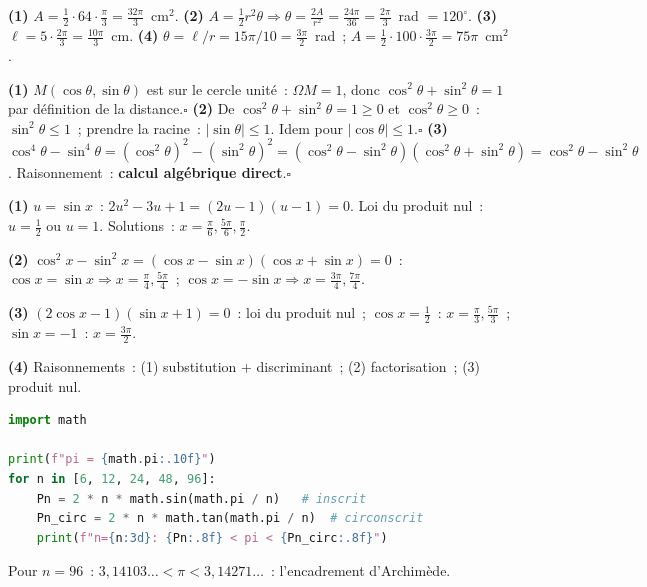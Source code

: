 
\textbf{(1)} $A=\frac{1}{2}\cdot64\cdot\frac{\pi}{3}=\frac{32\pi}{3}$~cm$^2$.
\textbf{(2)} $A=\frac{1}{2}r^2\theta\Rightarrow\theta=\frac{2A}{r^2}=\frac{24\pi}{36}=\frac{2\pi}{3}$~rad $=120^{\circ}$.
\textbf{(3)} $\ell=5\cdot\frac{2\pi}{3}=\frac{10\pi}{3}$~cm.
\textbf{(4)} $\theta=\ell/r=15\pi/10=\frac{3\pi}{2}$~rad~; $A=\frac{1}{2}\cdot100\cdot\frac{3\pi}{2}=75\pi$~cm$^2$.


\textbf{(1)} $M(\cos\theta,\sin\theta)$ est sur le cercle unit\'e~: $\Omega M=1$, donc
$\cos^2\theta+\sin^2\theta=1$ par d\'efinition de la distance.\hfill$\square$
\textbf{(2)} De $\cos^2\theta+\sin^2\theta=1\geq0$ et $\cos^2\theta\geq0$~: $\sin^2\theta\leq1$~;
prendre la racine~: $|\sin\theta|\leq1$. Idem pour $|\cos\theta|\leq1$.\hfill$\square$
\textbf{(3)} $\cos^4\theta-\sin^4\theta=(\cos^2\theta)^2-(\sin^2\theta)^2=(\cos^2\theta-\sin^2\theta)(\cos^2\theta+\sin^2\theta)=\cos^2\theta-\sin^2\theta$.
Raisonnement~: \textbf{calcul alg\'ebrique direct}.\hfill$\square$


\textbf{(1)} $u=\sin x$~: $2u^2-3u+1=(2u-1)(u-1)=0$. Loi du produit nul~: $u=\frac{1}{2}$ ou $u=1$.
Solutions~: $x=\frac{\pi}{6},\frac{5\pi}{6},\frac{\pi}{2}$.

\textbf{(2)} $\cos^2x-\sin^2x=(\cos x-\sin x)(\cos x+\sin x)=0$~:
$\cos x=\sin x\Rightarrow x=\frac{\pi}{4},\frac{5\pi}{4}$~; $\cos x=-\sin x\Rightarrow x=\frac{3\pi}{4},\frac{7\pi}{4}$.

\textbf{(3)} $(2\cos x-1)(\sin x+1)=0$~: loi du produit nul~;
$\cos x=\frac{1}{2}$~: $x=\frac{\pi}{3},\frac{5\pi}{3}$~; $\sin x=-1$~: $x=\frac{3\pi}{2}$.

\textbf{(4)} Raisonnements~: (1) substitution + discriminant~; (2) factorisation~; (3) produit nul.


\begin{lstlisting}[language=Python]
import math

print(f"pi = {math.pi:.10f}")
for n in [6, 12, 24, 48, 96]:
    Pn = 2 * n * math.sin(math.pi / n)   # inscrit
    Pn_circ = 2 * n * math.tan(math.pi / n)  # circonscrit
    print(f"n={n:3d}: {Pn:.8f} < pi < {Pn_circ:.8f}")
\end{lstlisting}
Pour $n=96$~: $3{,}14103\ldots<\pi<3{,}14271\ldots$~: l'encadrement d'Archim\`ede.

